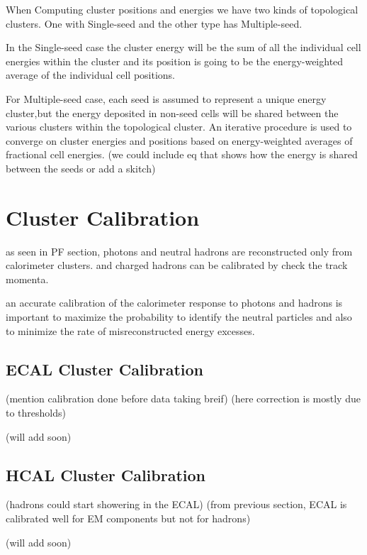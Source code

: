 When Computing cluster positions and energies we have two kinds of topological clusters.
One with Single-seed and the other type has Multiple-seed.

In the Single-seed case the cluster energy will be the sum of all the individual cell energies within the cluster and its position is going to be the energy-weighted average of the individual cell positions.

For Multiple-seed case, each seed is assumed to represent a unique energy cluster,but the energy deposited in non-seed cells will be shared between the various clusters within the topological cluster.
An iterative procedure is used to converge on cluster energies and positions based on energy-weighted averages of fractional cell energies.
(we could include eq that shows how the energy is shared between the seeds or add a skitch)

\section{Cluster Calibration}

as seen in PF section, photons and neutral hadrons are reconstructed only from calorimeter clusters.
and charged hadrons can be calibrated by check the track momenta.

an accurate calibration of the calorimeter response to photons and hadrons is important to maximize the probability to identify the neutral particles and
also to minimize the rate of misreconstructed energy excesses.

\subsection{ECAL Cluster Calibration}

(mention calibration done before data taking breif) 
(here correction is mostly due to thresholds) 

(will add soon)	

\subsection{HCAL Cluster Calibration}

(hadrons could start showering in the ECAL)
(from previous section, ECAL is calibrated well for EM components but not for hadrons)

(will add soon)	
